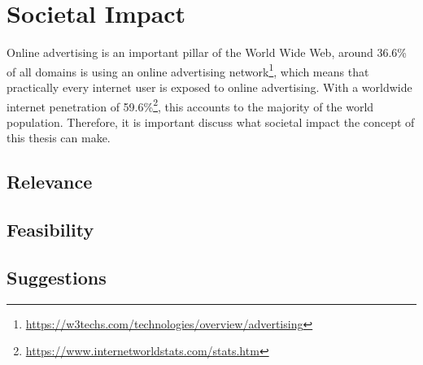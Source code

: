 \chapter{Societal Impact}
\label{cha:societalimpact}

Online advertising is an important pillar of the World Wide Web, around 36.6\% of all domains is using an online advertising network\footnote{\url{https://w3techs.com/technologies/overview/advertising}}, which means that practically every internet user is exposed to online advertising. With a worldwide internet penetration of 59.6\%\footnote{\url{https://www.internetworldstats.com/stats.htm}}, this accounts to the majority of the world population. Therefore, it is important discuss what societal impact the concept of this thesis can make.

\section{Relevance}

\section{Feasibility}

\section{Suggestions}